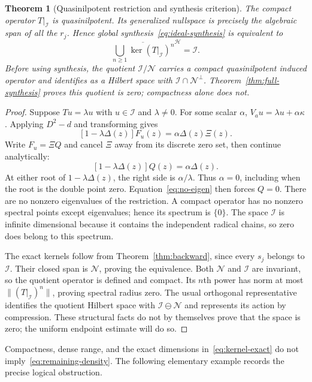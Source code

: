 \documentclass[11pt,a4paper]{article}
\numberwithin{equation}{section}
\newtheorem{theorem}{Theorem}[section]
\theoremstyle{definition}
\theoremstyle{remark}
\newcommand{\Hh}{\mathcal H}
\newcommand{\Nn}{\mathcal N}
\newcommand{\Ii}{\mathcal I}
\newcommand{\norm}[1]{\lVert #1\rVert}
\begin{document}
\begin{theorem}[Quasinilpotent restriction and synthesis criterion]\label{thm:quasinilpotent}
The compact operator $T|_{\Ii}$ is quasinilpotent. Its generalized nullspace is precisely the algebraic span of all the $r_j$. Hence global synthesis~\eqref{eq:ideal-synthesis} is equivalent to
\begin{equation}\label{eq:remaining-density}
 \overline{\bigcup_{n\ge1}\ker(T|_{\Ii})^n}^{\Hh}=\Ii.
\end{equation}
Before using synthesis, the quotient $\Ii/\Nn$ carries a compact quasinilpotent induced operator and identifies as a Hilbert space with $\Ii\cap\Nn^\perp$. Theorem~\ref{thm:full-synthesis} proves this quotient is zero; compactness alone does not.
\end{theorem}
\begin{proof}
Suppose $Tu=\lambda u$ with $u\in\Ii$ and $\lambda\ne0$. For some scalar $\alpha$,
$V_au=\lambda u+\alpha\kappa$. Applying $D^2-d$ and transforming gives
\[
 [1-\lambda\Delta(z)]F_u(z)=\alpha\Delta(z)\Xi(z).
\]
Write $F_u=\Xi Q$ and cancel $\Xi$ away from its discrete zero set, then continue analytically:
\begin{equation}\label{eq:no-eigen}
 [1-\lambda\Delta(z)]Q(z)=\alpha\Delta(z).
\end{equation}
At either root of $1-\lambda\Delta(z)$, the right side is $\alpha/\lambda$. Thus $\alpha=0$, including when the root is the double point zero. Equation~\eqref{eq:no-eigen} then forces $Q=0$. There are no nonzero eigenvalues of the restriction. A compact operator has no nonzero spectral points except eigenvalues; hence its spectrum is $\{0\}$. The space $\Ii$ is infinite dimensional because it contains the independent radical chains, so zero does belong to this spectrum.

The exact kernels follow from Theorem~\ref{thm:backward}, since every $s_j$ belongs to $\Ii$. Their closed span is $\Nn$, proving the equivalence. Both $\Nn$ and $\Ii$ are invariant, so the quotient operator is defined and compact. Its $n$th power has norm at most $\norm{(T|_{\Ii})^n}$, proving spectral radius zero. The usual orthogonal representative identifies the quotient Hilbert space with $\Ii\ominus\Nn$ and represents its action by compression. These structural facts do not by themselves prove that the space is zero; the uniform endpoint estimate will do so.
\end{proof}

Compactness, dense range, and the exact dimensions in~\eqref{eq:kernel-exact} do not imply~\eqref{eq:remaining-density}. The following elementary example records the precise logical obstruction.
\end{document}
